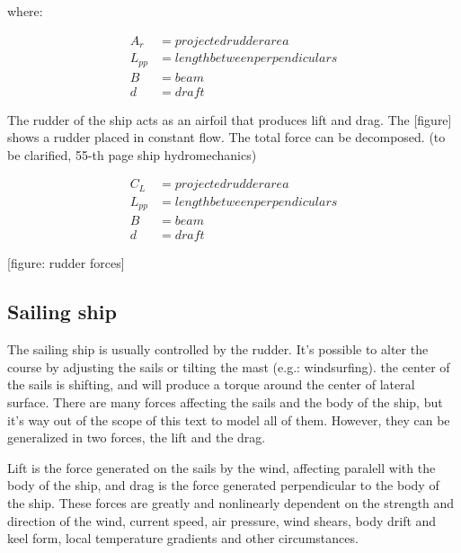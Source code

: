 where:

\begin{align}
	A_r &= projected rudder area \\
	L_{pp} &= length between perpendiculars \\
	B &= beam \\
	d &= draft
\end{align}


The rudder of the ship acts as an airfoil that produces lift and drag. The [figure] shows a rudder placed in constant flow. The total force can be decomposed. (to be clarified, 55-th page ship hydromechanics)

\begin{align}
	C_L &= projected rudder area \\
	L_{pp} &= length between perpendiculars \\
	B &= beam \\
	d &= draft
\end{align}

[figure: rudder forces]

\subsection{Sailing ship}

The sailing ship is usually controlled by the rudder. It’s possible to alter the course by adjusting the sails or tilting the mast (e.g.: windsurfing). the center of the sails is shifting, and will produce a torque around the center of lateral surface.
There are many forces affecting the sails and the body of the ship, but it’s way out of the scope of this text to model all of them. However, they can be generalized in two forces, the lift and the drag.

Lift is the force generated on the sails by the wind, affecting paralell with the body of the ship, and drag is the force generated perpendicular to the body of the ship. These forces are greatly and nonlinearly dependent on the strength and direction of the wind, current speed, air pressure, wind shears, body drift and keel form, local temperature gradients and other circumstances.

